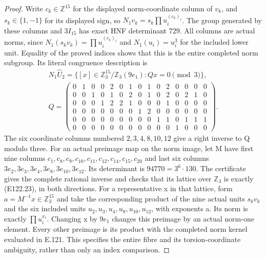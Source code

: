 \begin{proof}
Write $c_k\in\mathbb Z^{15}$ for the displayed norm-coordinate
column of $v_k$, and $s_k\in\{1,-1\}$ for its displayed sign, so
$N_1v_k=s_k\prod u_i^{(c_k)_i}$. The group generated by these
columns and $3I_{15}$ has exact HNF determinant $729$.
All columns are actual norms, since $N_1(s_kv_k)=\prod u_i^{(c_k)_i}$
and $N_1(u_i)=u_i^3$ for the included lower unit. Equality of the
proved indices shows that this is the entire completed norm subgroup.
Its literal congruence description is
\[
 \begin{gathered}
 N_1\widehat U_2=
 \{[x]\in\mathbb Z_3^{15}/\mathbb Z_3(9e_1):Qx=0\pmod3\},\\[-2pt]
 Q=\left(\begin{array}{*{15}{c}}
 0&1&0&0&2&0&1&0&1&0&2&0&0&0&0\\
 0&0&1&0&1&0&2&0&1&0&2&0&2&1&0\\
 0&0&0&1&2&2&1&0&0&0&1&0&0&0&0\\
 0&0&0&0&0&0&0&1&2&0&0&0&0&0&0\\
 0&0&0&0&0&0&0&0&0&1&1&0&1&1&1\\
 0&0&0&0&0&0&0&0&0&0&0&1&0&0&0
 \end{array}\right).
 \end{gathered}
 \tag{E122.23}
\]
The six coordinate columns numbered $2,3,4,8,10,12$ give a right
inverse to Q modulo three. For an actual preimage map on the norm
image, let M have first nine columns
$c_1,c_8,c_9,c_{10},c_{11},c_{12},c_{14},c_{15},c_{20}$ and last
six columns $3e_2,3e_3,3e_4,3e_8,3e_{10},3e_{12}$.
Its determinant is $94770=3^6\cdot130$. The certificate gives the
complete rational inverse and checks that its lattice over
$\mathbb Z_3$ is exactly (E122.23), in both directions.
For a representative x in that lattice, form $a=M^{-1}x\in\mathbb Z_3^{15}$
and take the corresponding product of the nine actual units $s_kv_k$
and the six included units $u_2,u_3,u_4,u_8,u_{10},u_{12}$,
with exponents a. Its norm is exactly $\prod u_i^{x_i}$.
Changing x by $9e_1$ changes this preimage by an actual norm-one
element. Every other preimage is its product with the completed
norm kernel evaluated in E.121. This specifies the entire fibre
and its torsion-coordinate ambiguity, rather than only an index comparison.


\end{proof}
